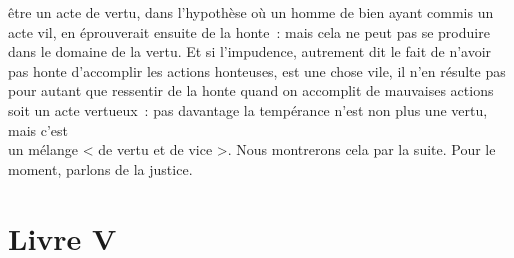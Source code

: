 \documentclass[french,twoside]{book} %
\begin{document}
être un acte de vertu, dans l’hypothèse où un homme de bien ayant commis un acte vil, en éprouverait ensuite de la honte : mais cela ne peut pas se produire dans le domaine de la vertu. Et si l’impudence, autrement dit le fait de n’avoir pas honte d’accomplir les actions honteuses, est une chose vile, il n’en résulte pas pour autant que ressentir de la honte quand on accomplit de mauvaises actions soit un acte vertueux : pas davantage la tempérance n’est non plus une vertu, mais c’est \\
un mélange < de vertu et de vice >. Nous montrerons cela par la suite. Pour le moment, parlons de la justice.
\section[{Livre V}]{Livre V}\renewcommand{\leftmark}{Livre V}
\end{document}

